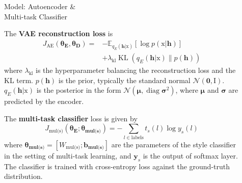 \documentclass[final]{beamer}
\newlength{\sepwid}
\newlength{\onecolwid}
\newlength{\twocolwid}
\newcommand{\rmx}{\mathrm x}
\newcommand{\loss}[1]{J_{\text{#1}}}
\newcommand{\hyp}[1]{\lambda_{\text{#1}}}
\newcommand{\nnweight}[1]{\bm{\theta_{\text{#1}}}}
\newcommand{\weight}[1]{W_{\text{#1}}}
\newcommand{\bias}[1]{\bm{b_{\text{#1}}}}
\begin{document}
\begin{frame}[t]
\begin{columns}[t]
\begin{column}{\onecolwid}

        \end{column} %

        \begin{column}{\sepwid}\end{column} %

        \begin{column}{\twocolwid} %

            \begin{columns}[t,totalwidth=\twocolwid] %

                \begin{column}{\onecolwid}\vspace{-.6in} %

                    \begin{block}{Model: Autoencoder \&\\Multi-task Classifier}

                        The \textbf{VAE \cite{kingma2013auto} reconstruction loss} is
                        \begin{align*}
                            \loss{AE}(\nnweight{E}, \nnweight{D}) = & - \mathbb{E}_{q_{E}(\bm h|\rmx)} [\log p(\rmx|\bm h)]    \\
                                                                    & + \hyp{kl}\operatorname{KL}(q_{E}(\bm h|\rmx)\|p(\bm h))
                        \end{align*}
                        where $\hyp{kl}$ is the hyperparameter balancing the reconstruction loss and the KL term. $p(\bm h)$ is the prior, typically the standard normal  $\mathcal{N}(\bm 0,\mathrm I)$. $q_E(\bm h|\mathrm x)$ is the posterior in the form $\mathcal{N}(\bm \mu,\operatorname{diag} \bm\sigma^2)$, where $\bm\mu$ and $\bm\sigma$ are predicted by the encoder.

                        The \textbf{multi-task classifier} loss is given by
                        \begin{equation*}
                            \loss{mul(s)}(\nnweight{E};\nnweight{mul(s)}) = - \sum_{l\in\text{labels}} t_s(l)\log y_s(l)
                        \end{equation*}
                        where $\nnweight{mul(s)}=[\weight{mul(s)}; \bias{mul(s)}]$ are the parameters of the style classifier in the setting of multi-task learning, and $\bm y_s$ is the output of softmax layer.
                        The classifier is trained with cross-entropy loss against the ground-truth distribution.


\end{block}
\end{column}
\end{columns}
\end{column}
\end{columns}
\end{frame}
\end{document}
